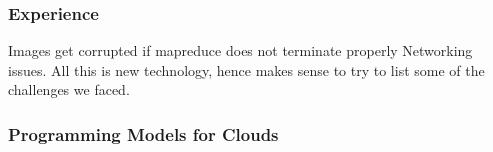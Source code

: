 \documentclass[conference,final]{IEEEtran}
\newcommand{\jhanote}[1]{ {\textcolor{red} { ***SJ: #1 }}}
\newcommand{\jhanote}[1]{}
\newcommand{\sagamapreduce }{SAGA-MapReduce }
\begin{document}



\subsubsection*{Experience}
Images get corrupted if mapreduce does not terminate properly
Networking issues.  All this is new technology, hence makes sense to
try to list some of the challenges we faced.



\subsubsection*{Programming Models for Clouds}

\end{document}
